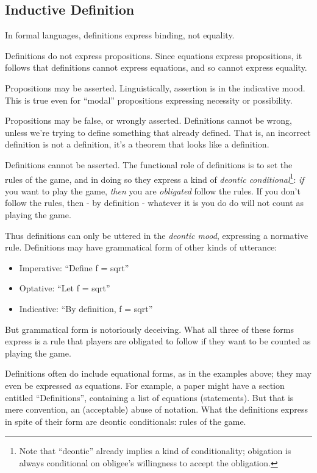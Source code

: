 \documentclass{article}
\begin{document}
\subsection{Inductive Definition}

In formal languages, definitions express binding, not equality.

Definitions do not express propositions. Since equations express
propositions, it follows that definitions cannot express equations,
and so cannot express equality.

Propositions may be asserted. Linguistically, assertion is in the
indicative mood. This is true even for ``modal'' propositions
expressing necessity or possibility.

Propositions may be false, or wrongly asserted. Definitions cannot be
wrong, unless we're trying to define something that already defined.
That is, an incorrect definition is not a definition, it's a theorem
that looks like a definition.

Definitions cannot be asserted. The functional role of definitions is
to set the rules of the game, and in doing so they express a kind of
\textit{deontic conditional}\footnote{Note that ``deontic'' already
implies a kind of conditionality; obigation is always conditional on
obligee's willingness to accept the obligation.}: \textit{if} you want
to play the game, \textit{then} you are \textit{obligated} follow the
rules. If you don't follow the rules, then - by definition - whatever
it is you do do will not count as playing the game.

Thus definitions can only be uttered in the \textit{deontic mood},
expressing a normative rule. Definitions may have grammatical form of
other kinds of utterance:

\begin{itemize}
\item Imperative: ``Define f = sqrt''
\item Optative: ``Let  f = sqrt''
\item Indicative: ``By definition, f = sqrt''
\end{itemize}

But grammatical form is notoriously deceiving. What all three of these
forms express is a rule that players are obligated to follow if they
want to be counted as playing the game.

Definitions often do include equational forms, as in the examples
above; they may even be expressed \textit{as} equations. For example,
a paper might have a section entitled ``Definitions'', containing a
list of equations (statements). But that is mere convention, an
(acceptable) abuse of notation. What the definitions express in spite
of their form are deontic conditionals: rules of the game.
\end{document}
